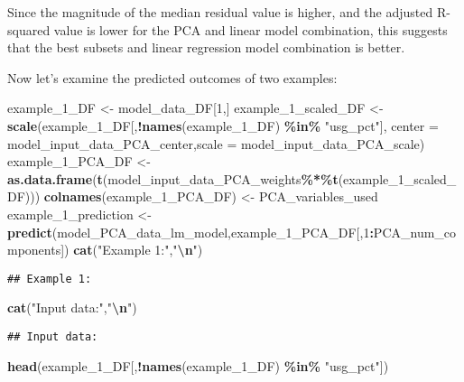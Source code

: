 \documentclass[
]{article}
\newenvironment{Shaded}{\begin{snugshade}}{\end{snugshade}}
\newcommand{\AttributeTok}[1]{\textcolor[rgb]{0.13,0.29,0.53}{#1}}
\newcommand{\DecValTok}[1]{\textcolor[rgb]{0.00,0.00,0.81}{#1}}
\newcommand{\FunctionTok}[1]{\textcolor[rgb]{0.13,0.29,0.53}{\textbf{#1}}}
\newcommand{\NormalTok}[1]{#1}
\newcommand{\OtherTok}[1]{\textcolor[rgb]{0.56,0.35,0.01}{#1}}
\newcommand{\SpecialCharTok}[1]{\textcolor[rgb]{0.81,0.36,0.00}{\textbf{#1}}}
\newcommand{\StringTok}[1]{\textcolor[rgb]{0.31,0.60,0.02}{#1}}
\begin{document}
Since the magnitude of the median residual value is higher, and the
adjusted R-squared value is lower for the PCA and linear model
combination, this suggests that the best subsets and linear regression
model combination is better.

Now let's examine the predicted outcomes of two examples:

\begin{Shaded}
\begin{Highlighting}[]
\NormalTok{example\_1\_DF }\OtherTok{\textless{}{-}}\NormalTok{ model\_data\_DF[}\DecValTok{1}\NormalTok{,]}
\NormalTok{example\_1\_scaled\_DF }\OtherTok{\textless{}{-}} \FunctionTok{scale}\NormalTok{(example\_1\_DF[,}\SpecialCharTok{!}\FunctionTok{names}\NormalTok{(example\_1\_DF) }\SpecialCharTok{\%in\%} \StringTok{"usg\_pct"}\NormalTok{],}
            \AttributeTok{center =}\NormalTok{ model\_input\_data\_PCA\_center,}\AttributeTok{scale =}\NormalTok{ model\_input\_data\_PCA\_scale)}
\NormalTok{example\_1\_PCA\_DF }\OtherTok{\textless{}{-}} 
  \FunctionTok{as.data.frame}\NormalTok{(}\FunctionTok{t}\NormalTok{(model\_input\_data\_PCA\_weights}\SpecialCharTok{\%*\%}\FunctionTok{t}\NormalTok{(example\_1\_scaled\_DF)))}
\FunctionTok{colnames}\NormalTok{(example\_1\_PCA\_DF) }\OtherTok{\textless{}{-}}\NormalTok{ PCA\_variables\_used}
\NormalTok{example\_1\_prediction }\OtherTok{\textless{}{-}}
  \FunctionTok{predict}\NormalTok{(model\_PCA\_data\_lm\_model,example\_1\_PCA\_DF[,}\DecValTok{1}\SpecialCharTok{:}\NormalTok{PCA\_num\_components])}
\FunctionTok{cat}\NormalTok{(}\StringTok{"Example 1:"}\NormalTok{,}\StringTok{"}\SpecialCharTok{\textbackslash{}n}\StringTok{"}\NormalTok{)}
\end{Highlighting}
\end{Shaded}

\begin{verbatim}
## Example 1:
\end{verbatim}

\begin{Shaded}
\begin{Highlighting}[]
\FunctionTok{cat}\NormalTok{(}\StringTok{"Input data:"}\NormalTok{,}\StringTok{"}\SpecialCharTok{\textbackslash{}n}\StringTok{"}\NormalTok{)}
\end{Highlighting}
\end{Shaded}

\begin{verbatim}
## Input data:
\end{verbatim}

\begin{Shaded}
\begin{Highlighting}[]
\FunctionTok{head}\NormalTok{(example\_1\_DF[,}\SpecialCharTok{!}\FunctionTok{names}\NormalTok{(example\_1\_DF) }\SpecialCharTok{\%in\%} \StringTok{"usg\_pct"}\NormalTok{])}
\end{Highlighting}
\end{Shaded}
\end{document}
